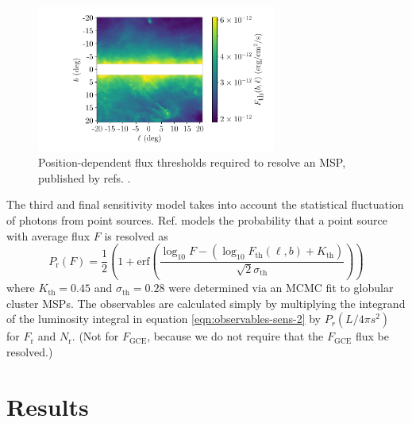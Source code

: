 \documentclass[a4paper,11pt]{article}
\newcommand{\parens}[1]{\left(#1\right)}
\newcommand{\comment}[1]{\emph{\color{red}{#1}}}
\begin{document}
\begin{figure}
    \centering
    \includegraphics[width=0.7\textwidth]{figs/sensitivity-map.pdf}
    \caption{Position-dependent flux thresholds required to resolve an MSP, published by refs. \cite{Fermi-LAT:2019yla, Ballet:2020hze}. \comment{Maybe I shouldn't show this plot. It's barely original; just a display of a FITS file pulled from the 4FGL website. But I could overlay the previous figure of where the 47 point sources are. Would that be useful?}}
    \label{fig:sensitivity}
\end{figure}

The third and final sensitivity model takes into account the statistical fluctuation of photons from point sources. Ref. \cite{Ploeg:2020jeh} models the probability that a point source with average flux $F$ is resolved as
\begin{equation}
    P_\text{r}(F) = \frac{1}{2} \parens{1 + \text{erf} \parens{\frac{\log_{10} F - (\log_{10} F_\text{th}(\ell, b) + K_\text{th})}{\sqrt{2}\sigma_\text{th}}}}
    \label{eqn:ploeg-smoothing}
\end{equation}
where $K_\text{th} = 0.45$ and $\sigma_\text{th} = 0.28$ were determined via an MCMC fit to globular cluster MSPs. The observables are calculated simply by multiplying the integrand of the luminosity integral in equation \ref{eqn:observables-sens-2} by $P_r(L/4\pi s^2)$ for $F_\text{r}$ and $N_\text{r}$. (Not for $F_\text{GCE}$, because we do not require that the $F_\text{GCE}$ flux be resolved.)






\section{Results}
\end{document}
